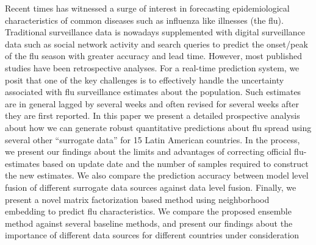 Recent times has witnessed a surge of interest in forecasting epidemiological 
characteristics of common diseases such as influenza like illnesses (the flu).
Traditional surveillance data is nowadays supplemented with digital surveillance data
such as social network activity and search queries to predict the onset/peak of
the flu season with greater accuracy and lead time. However, most published
studies have been retrospective analyses. For a real-time prediction system,
we posit that one of the key challenges is to effectively handle the uncertainty
associated with flu surveillance estimates about the population.
Such estimates are in general lagged by several weeks and often revised
for several weeks after they are first reported. In this paper we present a detailed
prospective analysis about how we can generate robust quantitative predictions  
about flu spread using several other ``surrogate data'' for 15 Latin
American countries. In the process, we present our findings about the limits and
advantages of correcting official flu-estimates based on update date and
the number of samples required to construct the new estimates. We also compare the
prediction accuracy between model level fusion of different surrogate data sources
against data level fusion. Finally, we present a novel matrix factorization based 
method using neighborhood embedding to predict flu characteristics. 
We compare the proposed ensemble method against several baseline methods, and 
present our findings about the importance of different data 
sources for different countries under consideration